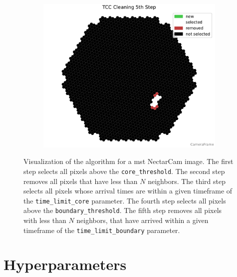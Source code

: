 \begin{figure}
\begin{subfigure}[]{0.32\textwidth}
        \includegraphics[width=\textwidth]{plots/cleaner_steps/tcc_5.pdf}
    \end{subfigure}
    \caption{Visualization of the \tcc{} algorithm for a \gls{mst} NectarCam image. The first step
    selects all pixels above the \texttt{core\_threshold}. The second step removes all pixels that have less than
    \(N\) neighbors. The third step selects all pixels whose arrival times are within a given timeframe of the
    \texttt{time\_limit\_core} parameter. The fourth step selects all pixels above the \texttt{boundary\_threshold}.
    The fifth step removes all pixels with less than \(N\) neighbors, that have arrived within a given timeframe
    of the \texttt{time\_limit\_boundary} parameter.}
    \label{fig:tcc_cleaning}
\end{figure}
\vspace{-0.5cm}
\section{Hyperparameters}
\label{sec:hyperparameters}

